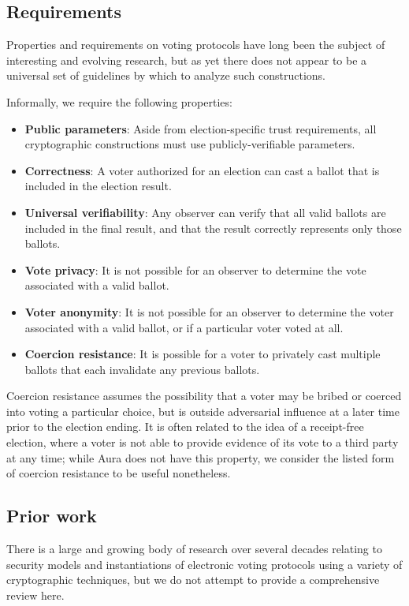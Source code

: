 \documentclass{llncs}
\begin{document}
\subsection{Requirements}

Properties and requirements on voting protocols have long been the subject of interesting and evolving research, but as yet there does not appear to be a universal set of guidelines by which to analyze such constructions.

Informally, we require the following properties:
\begin{itemize}
    \item \textbf{Public parameters}: Aside from election-specific trust requirements, all cryptographic constructions must use publicly-verifiable parameters.
    \item \textbf{Correctness}: A voter authorized for an election can cast a ballot that is included in the election result.
    \item \textbf{Universal verifiability}: Any observer can verify that all valid ballots are included in the final result, and that the result correctly represents only those ballots.
    \item \textbf{Vote privacy}: It is not possible for an observer to determine the vote associated with a valid ballot.
    \item \textbf{Voter anonymity}: It is not possible for an observer to determine the voter associated with a valid ballot, or if a particular voter voted at all.
    \item \textbf{Coercion resistance}: It is possible for a voter to privately cast multiple ballots that each invalidate any previous ballots.
\end{itemize}

Coercion resistance assumes the possibility that a voter may be bribed or coerced into voting a particular choice, but is outside adversarial influence at a later time prior to the election ending.
It is often related to the idea of a receipt-free election, where a voter is not able to provide evidence of its vote to a third party at any time; while Aura does not have this property, we consider the listed form of coercion resistance to be useful nonetheless.


\subsection{Prior work}

There is a large and growing body of research over several decades relating to security models and instantiations of electronic voting protocols using a variety of cryptographic techniques, but we do not attempt to provide a comprehensive review here.
\end{document}
